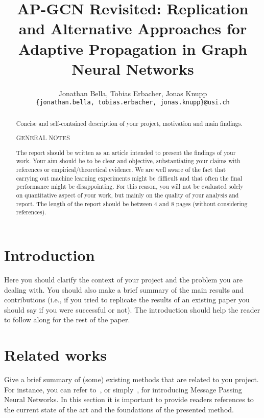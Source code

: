 \documentclass{gdl}
\begin{document}
\title{AP-GCN Revisited: Replication and Alternative Approaches for Adaptive Propagation in Graph Neural Networks}

\author{%
Jonathan Bella, Tobias Erbacher, Jonas Knupp\\
\texttt{\{jonathan.bella, tobias.erbacher, jonas.knupp\}@usi.ch}
}

\begin{abstract}
Concise and self-contained description of your project, motivation and main findings.

\begin{center}
    \sf\large\color{red} GENERAL NOTES
\end{center}

The report should be written as an article intended to present the findings of your work. Your aim should be to be clear and objective, substantiating your claims with references or empirical/theoretical evidence.
We are well aware of the fact that carrying out machine learning experiments might be difficult and that often the final performance might be disappointing. For this reason, you will not be evaluated solely on quantitative aspect of your work, but mainly on the quality of your analysis and report.
The length of the report should be between 4 and 8 pages (without considering references).
\end{abstract}

\maketitle

\section{Introduction}

Here you should clarify the context of your project and the problem you are dealing with. You should also make a brief summary of the main results and contributions (i.e., if you tried to replicate the results of an existing paper you should say if you were successful or not). The introduction should help the reader to follow along for the rest of the paper.


\section{Related works}

Give a brief summary of (some) existing methods that are related to you project. For instance, you can refer to~\citet{gilmer2017neural}, or simply~\cite{gilmer2017neural}, for introducing Message Passing Neural Networks. In this section it is important to provide readers references to the current state of the art and the foundations of the presented method. 
\end{document}
